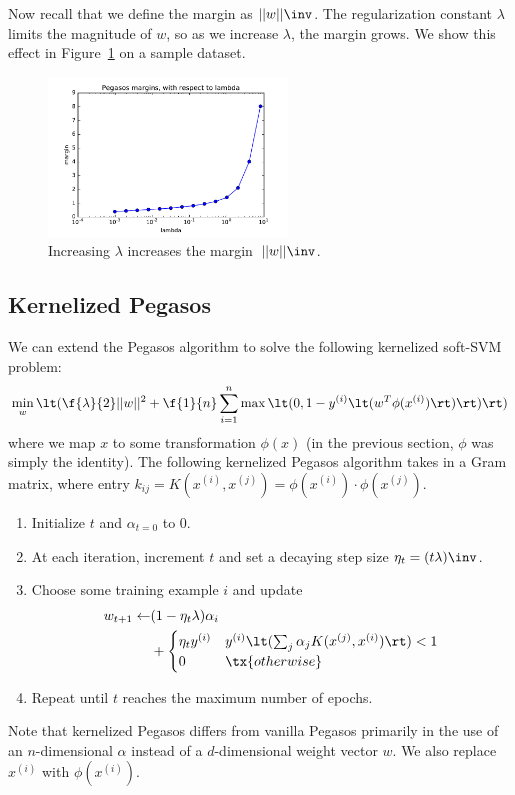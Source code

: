 \documentclass{article}
\newcommand{\sind}[1]{^{(#1)}}
\begin{document}
\begin{multicols}{2}
Now recall that we define the margin as $||w||\inv$.
The regularization constant $\lambda$ limits the magnitude of $w$,
so as we increase $\lambda$, the margin grows.
We show this effect in Figure~\ref{fig:3-2-margins} on a sample dataset.

\begin{figure}[t]
   \centering
	\includegraphics[width=2.5in]{img/3-2-margins.pdf}
   \caption{Increasing $\lambda$ increases the margin~$||w||\inv$.}
   \label{fig:3-2-margins}
\end{figure}

\subsection{Kernelized Pegasos}
\label{subsec:kernel-peg}

We can extend the Pegasos algorithm
to solve the following kernelized soft-SVM problem:
\begin{equation}
   \min_w \lt( \f{\lambda}{2}||w||^2
   +
   \f{1}{n}\sum_{i=1}^n \max\lt(0,1-y\sind{i}\lt(w^T\phi(x\sind{i})\rt)\rt) \rt)
\end{equation}
where we map $x$ to some transformation $\phi(x)$
(in the previous section, $\phi$ was simply the identity).
The following kernelized Pegasos algorithm takes in a Gram matrix, 
where entry $k_{ij} = K(x^{(i)},x^{(j)}) = \phi(x^{(i)})\cdot\phi(x^{(j)})$.
\begin{enumerate}
    \item
    Initialize $t$ and $\alpha_{t=0}$ to 0.
    \item
    At each iteration, increment $t$
    and set a decaying step size $\eta_t = (t\lambda)\inv$.
    \item
    Choose some training example $i$ and update
    \[
    \begin{split}
        w_{t+1} \leftarrow &(1 - \eta_t\lambda)\alpha_i \\ &+
            \begin{cases}
            \eta_t y\sind{i} & y\sind{i}\lt(\sum_j{\alpha_jK(x\sind{j},x\sind{i})}\rt)<1 \\
            0 & \tx{otherwise}
            \end{cases}
    \end{split}
    \]
    \item
    Repeat until $t$ reaches the maximum number of epochs.
\end{enumerate}
Note that kernelized Pegasos differs from vanilla Pegasos
primarily in the use of an $n$-dimensional $\alpha$
instead of a $d$-dimensional weight vector $w$.
We also replace $x\sind{i}$ with $\phi(x\sind{i})$.


\end{multicols}
\end{document}
